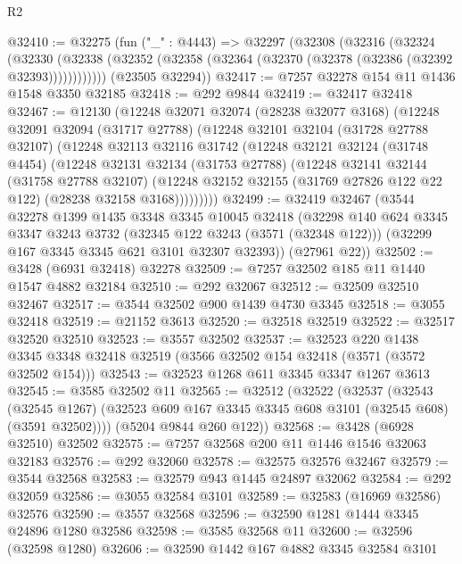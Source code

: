 \begin{lexlean}{R2}
\begin{coremodule}
@32410 := @32275
    (fun ("_" : @4443) =>
    @32297
      (@32308
        (@32316
          (@32324
            (@32330
              (@32338 (@32352 (@32358 (@32364 (@32370 (@32378 (@32386 (@32392 @32393))))))))))))
      (@23505 @32294))
@32417 := @7257 @32278 @154 @11 @1436 @1548 @3350 @32185
@32418 := @292 @9844
@32419 := @32417 @32418
@32467 := @12130
    (@12248
      @32071
      @32074
      (@28238 @32077 @3168)
      (@12248
        @32091
        @32094
        (@31717 @27788)
        (@12248
          @32101
          @32104
          (@31728 @27788 @32107)
          (@12248
            @32113
            @32116
            @31742
            (@12248
              @32121
              @32124
              (@31748 @4454)
              (@12248
                @32131
                @32134
                (@31753 @27788)
                (@12248
                  @32141
                  @32144
                  (@31758 @27788 @32107)
                  (@12248 @32152 @32155 (@31769 @27826 @122 @22 @122) (@28238 @32158 @3168)))))))))
@32499 := @32419
    @32467
    (@3544
      @32278
      @1399
      @1435
      @3348
      @3345
      @10045
      @32418
      (@32298
        @140
        @624
        @3345
        @3347
        @3243
        @3732
        (@32345 @122 @3243 (@3571 (@32348 @122)))
        (@32299 @167 @3345 @3345 @621 @3101 @32307 @32393))
      (@27961 @22))
@32502 := @3428 (@6931 @32418) @32278
@32509 := @7257 @32502 @185 @11 @1440 @1547 @4882 @32184
@32510 := @292 @32067
@32512 := @32509 @32510 @32467
@32517 := @3544 @32502 @900 @1439 @4730 @3345
@32518 := @3055 @32418
@32519 := @21152 @3613
@32520 := @32518 @32519
@32522 := @32517 @32520 @32510
@32523 := @3557 @32502
@32537 := @32523
    @220
    @1438
    @3345
    @3348
    @32418
    @32519
    (@3566 @32502 @154 @32418 (@3571 (@3572 @32502 @154)))
@32543 := @32523 @1268 @611 @3345 @3347 @1267 @3613
@32545 := @3585 @32502 @11
@32565 := @32512
    (@32522
      (@32537
        (@32543
          (@32545 @1267)
          (@32523 @609 @167 @3345 @3345 @608 @3101 (@32545 @608) (@3591 @32502))))
      (@5204 @9844 @260 @122))
@32568 := @3428 (@6928 @32510) @32502
@32575 := @7257 @32568 @200 @11 @1446 @1546 @32063 @32183
@32576 := @292 @32060
@32578 := @32575 @32576 @32467
@32579 := @3544 @32568
@32583 := @32579 @943 @1445 @24897 @32062
@32584 := @292 @32059
@32586 := @3055 @32584 @3101
@32589 := @32583 (@16969 @32586) @32576
@32590 := @3557 @32568
@32596 := @32590 @1281 @1444 @3345 @24896 @1280 @32586
@32598 := @3585 @32568 @11
@32600 := @32596 (@32598 @1280)
@32606 := @32590 @1442 @167 @4882 @3345 @32584 @3101

\end{coremodule}
\end{lexlean}
